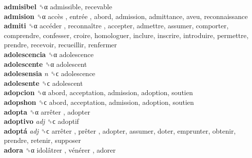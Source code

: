 \textbf{admisibel} ␝α  admissible, recevable  \\
\textbf{admision} ␝α   accès ,  entrée , abord, admission, admittance, aveu, reconnaissance  \\
\textbf{admiti} ␝α   accéder ,  reconnaître , accepter, admettre, assumer, comporter, comprendre, confesser, croire, homologuer, inclure, inscrire, introduire, permettre, prendre, recevoir, recueillir, renfermer  \\
\textbf{adolescencia} ␝α  adolescence  \\
\textbf{adolescente} ␝α  adolescent  \\
\textbf{adolesensia} \emph{n}  ␝ϲ  adolescence  \\
\textbf{adolesente} ␝ϲ  adolescent  \\
\textbf{adopcion} ␝α  abord, acceptation, admission, adoption, soutien  \\
\textbf{adopshon} ␝ϲ  abord, acceptation, admission, adoption, soutien  \\
\textbf{adopta} ␝α   arrêter , adopter  \\
\textbf{adoptivo} \emph{adj}  ␝ϲ  adoptif  \\
\textbf{adoptá} \emph{adj}  ␝ϲ   arrêter ,  prêter , adopter, assumer, doter, emprunter, obtenir, prendre, retenir, supposer  \\
\textbf{adora} ␝α   idolâtrer ,  vénérer , adorer  \\
